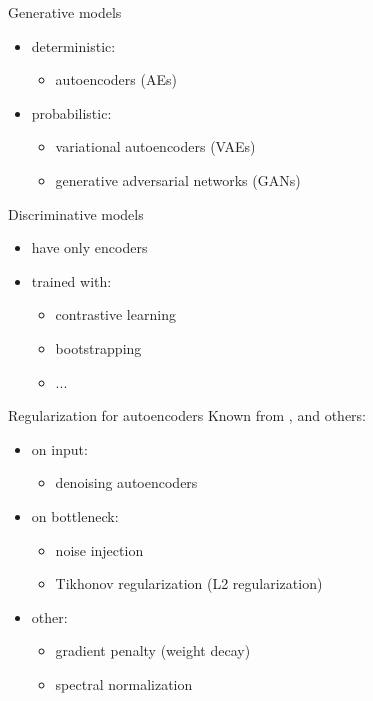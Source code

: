 \documentclass{beamer}
\begin{document}
\begin{frame}{Generative models}
		\begin{itemize}
				\item deterministic:
						\begin{itemize}
								\item autoencoders (AEs)
						\end{itemize}
				\item probabilistic:
						\begin{itemize}
								\item variational autoencoders (VAEs)
								\item generative adversarial networks (GANs)
						\end{itemize}
		\end{itemize}
\end{frame}

\begin{frame}{Discriminative models}
		\begin{itemize}
				\item have only encoders
				\item trained with:
						\begin{itemize}
								\item contrastive learning
								\item bootstrapping
								\item ...
						\end{itemize}
		\end{itemize}
\end{frame}


\begin{frame}{Regularization for autoencoders}
		Known from \cite{bengio2013representation}, \cite{ghosh2019variational} and others:
		\begin{itemize}
				\item on input: 
						\begin{itemize}
								\item denoising autoencoders
						\end{itemize}
				\item on bottleneck:
						\begin{itemize}
								\item noise injection
								\item Tikhonov regularization (L2 regularization)
						\end{itemize}
				\item other:
						\begin{itemize}
								\item gradient penalty (weight decay)
								\item spectral normalization
						\end{itemize}
		\end{itemize}
\end{frame}
\end{document}
